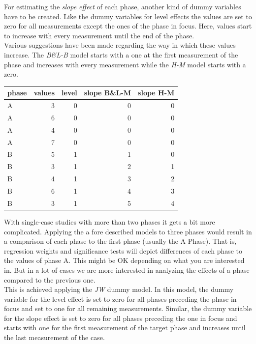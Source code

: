 \documentclass[
]{book}
\begin{document}
For estimating the \emph{slope effect} of each phase, another kind of dummy variables have to be created. Like the dummy variables for level effects the values are set to zero for all measurements except the ones of the phase in focus. Here, values start to increase with every measurement until the end of the phase.\\
Various suggestions have been made regarding the way in which these values increase. The \emph{B\&L-B} model starts with a one at the first measurement of the phase and increases with every measurement while the \emph{H-M} model starts with a zero.

\begin{tabular}{l|r|r|r|r}
\hline
phase & values & level & slope B\&L-M & slope H-M\\
\hline
A & 3 & 0 & 0 & 0\\
\hline
A & 6 & 0 & 0 & 0\\
\hline
A & 4 & 0 & 0 & 0\\
\hline
A & 7 & 0 & 0 & 0\\
\hline
B & 5 & 1 & 1 & 0\\
\hline
B & 3 & 1 & 2 & 1\\
\hline
B & 4 & 1 & 3 & 2\\
\hline
B & 6 & 1 & 4 & 3\\
\hline
B & 3 & 1 & 5 & 4\\
\hline
\end{tabular}

With single-case studies with more than two phases it gets a bit more complicated. Applying the a fore described models to three phases would result in a comparison of each phase to the first phase (usually the A Phase). That is, regression weights and significance tests will depict differences of each phase to the values of phase A. This might be OK depending on what you are interested in. But in a lot of cases we are more interested in analyzing the effects of a phase compared to the previous one.\\
This is achieved applying the \emph{JW} dummy model. In this model, the dummy variable for the level effect is set to zero for all phases preceding the phase in focus and set to one for all remaining measurements. Similar, the dummy variable for the slope effect is set to zero for all phases preceding the one in focus and starts with one for the first measurement of the target phase and increases until the last measurement of the case.
\end{document}
